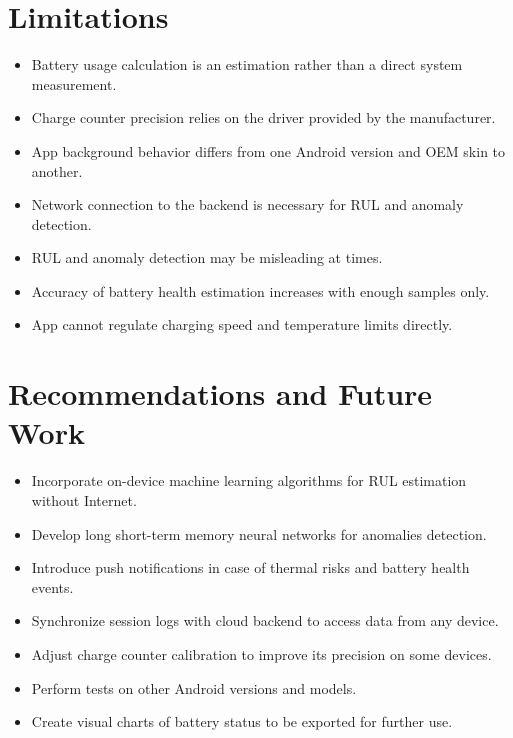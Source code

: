 \documentclass[12pt,a4paper]{report}
\begin{document}
\section{Limitations}

\begin{itemize}[leftmargin=1.5em]
  \item Battery usage calculation is an estimation rather than a direct system measurement.
  \item Charge counter precision relies on the driver provided by the manufacturer.
  \item App background behavior differs from one Android version and OEM skin to another.
  \item Network connection to the backend is necessary for RUL and anomaly detection.
  \item RUL and anomaly detection may be misleading at times.
  \item Accuracy of battery health estimation increases with enough samples only.
  \item App cannot regulate charging speed and temperature limits directly.
\end{itemize}

\section{Recommendations and Future Work}

\begin{itemize}[leftmargin=1.5em]
  \item Incorporate on-device machine learning algorithms for RUL estimation without Internet.
  \item Develop long short-term memory neural networks for anomalies detection.
  \item Introduce push notifications in case of thermal risks and battery health events.
  \item Synchronize session logs with cloud backend to access data from any device.
  \item Adjust charge counter calibration to improve its precision on some devices.
  \item Perform tests on other Android versions and models.
  \item Create visual charts of battery status to be exported for further use.
\end{itemize}

\end{document}
